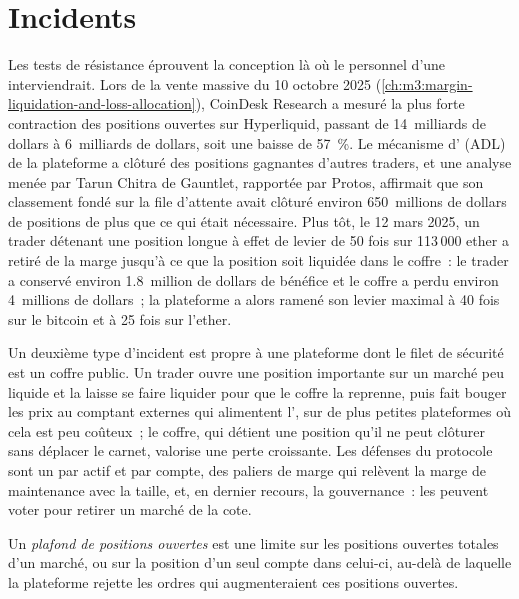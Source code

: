 \section{Incidents}

Les tests de résistance éprouvent la conception là où le personnel d'une  interviendrait. Lors de la vente massive du 10 octobre 2025
(\cref{ch:m3:margin-liquidation-and-loss-allocation}), CoinDesk Research a mesuré la plus forte contraction des positions ouvertes sur Hyperliquid,
passant de 14~milliards de dollars à 6~milliards de dollars, soit une baisse de 57~\%. Le mécanisme d' (ADL) de la plateforme a clôturé des positions gagnantes d'autres traders, et une analyse
menée par Tarun Chitra de Gauntlet, rapportée par Protos, affirmait que son classement fondé sur la file d'attente avait clôturé environ 650~millions de dollars de positions de plus que ce qui était
nécessaire. Plus tôt, le 12 mars 2025, un trader détenant une position longue à effet de levier de 50 fois sur 113\,000 ether a retiré de la marge jusqu'à ce que la position soit
liquidée dans le coffre~: le trader a conservé environ 1.8~million de dollars de bénéfice et le coffre a perdu environ 4~millions de dollars~; la plateforme a alors ramené
son levier maximal à 40 fois sur le bitcoin et à 25 fois sur l'ether.

Un deuxième type d'incident est propre à une plateforme dont le filet de sécurité est un coffre public. Un trader ouvre une position importante sur un marché peu liquide et la laisse
se faire liquider pour que le coffre la reprenne, puis fait bouger les prix au comptant externes qui alimentent l', sur de plus petites plateformes où cela est
peu coûteux~; le coffre, qui détient une position qu'il ne peut clôturer sans déplacer le carnet, valorise une perte croissante. Les défenses du protocole sont un
 par actif et par compte, des paliers de marge qui relèvent la marge de maintenance avec la taille, et, en dernier recours, la gouvernance~: les
 peuvent voter pour retirer un marché de la cote.

\begin{definition}\label{def:m3:on-chain-order-books-and-perpetual-dexs:oicap}
Un \emph{plafond de positions ouvertes} est une limite sur les positions ouvertes totales d'un marché, ou sur la position d'un seul compte dans celui-ci,
au-delà de laquelle la plateforme rejette les ordres qui augmenteraient ces positions ouvertes.
\end{definition}

